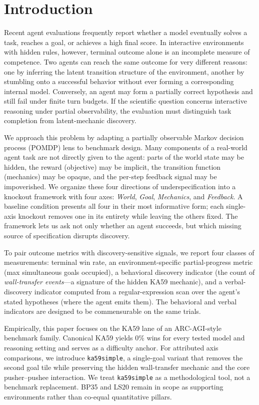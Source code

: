 \documentclass{article}
\begin{document}
\section{Introduction}
Recent agent evaluations frequently report whether a model eventually solves a task, reaches a goal, or achieves a high final score. In interactive environments with hidden rules, however, terminal outcome alone is an incomplete measure of competence. Two agents can reach the same outcome for very different reasons: one by inferring the latent transition structure of the environment, another by stumbling onto a successful behavior without ever forming a corresponding internal model. Conversely, an agent may form a partially correct hypothesis and still fail under finite turn budgets. If the scientific question concerns interactive reasoning under partial observability, the evaluation must distinguish task completion from latent-mechanic discovery.

We approach this problem by adapting a partially observable Markov decision process (POMDP) lens to benchmark design. Many components of a real-world agent task are not directly given to the agent: parts of the world state may be hidden, the reward (objective) may be implicit, the transition function (mechanics) may be opaque, and the per-step feedback signal may be impoverished. We organize these four directions of underspecification into a knockout framework with four axes: \emph{World}, \emph{Goal}, \emph{Mechanics}, and \emph{Feedback}. A baseline condition presents all four in their most informative form; each single-axis knockout removes one in its entirety while leaving the others fixed. The framework lets us ask not only whether an agent succeeds, but which missing source of specification disrupts discovery.

To pair outcome metrics with discovery-sensitive signals, we report four classes of measurements: terminal win rate, an environment-specific partial-progress metric (max simultaneous goals occupied), a behavioral discovery indicator (the count of \emph{wall-transfer events}---a signature of the hidden KA59 mechanic), and a verbal-discovery indicator computed from a regular-expression scan over the agent's stated hypotheses (where the agent emits them). The behavioral and verbal indicators are designed to be commensurable on the same trials.

Empirically, this paper focuses on the KA59 lane of an ARC-AGI-style benchmark family. Canonical KA59 yields $0\%$ wins for every tested model and reasoning setting and serves as a difficulty anchor. For attributed axis comparisons, we introduce \texttt{ka59simple}, a single-goal variant that removes the second goal tile while preserving the hidden wall-transfer mechanic and the core pusher--pushee interaction. We treat \texttt{ka59simple} as a methodological tool, not a benchmark replacement. BP35 and LS20 remain in scope as supporting environments rather than co-equal quantitative pillars.
\end{document}
